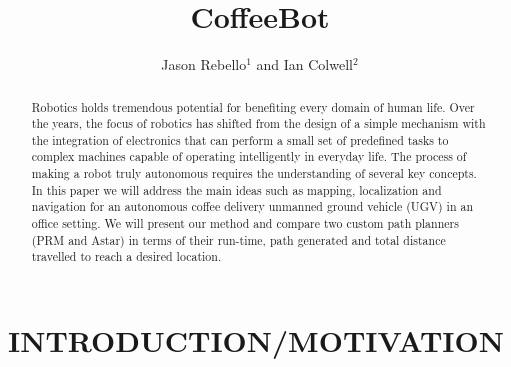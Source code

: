 \documentclass[letterpaper, 10 pt, conference]{ieeeconf}  %
\title{\LARGE \bf
CoffeeBot
}
\author{Jason Rebello$^{1}$ and Ian Colwell$^{2}$%
}
\begin{document}
\maketitle
\thispagestyle{empty}
\pagestyle{empty}


\begin{abstract}

Robotics holds tremendous potential for benefiting every domain of human life. Over the years, the focus of robotics has shifted from the design of a simple mechanism with the integration of electronics that can perform a small set of predefined tasks to complex machines capable of operating intelligently in everyday life. The process of making a robot truly autonomous requires the understanding of several key concepts. In this paper we will address the main ideas such as mapping, localization and navigation for an autonomous coffee delivery unmanned ground vehicle (UGV) in an office setting. We will present our method and compare two custom path planners (PRM and Astar) in terms of their run-time, path generated and total distance travelled to reach a desired location.

\end{abstract}

\section{INTRODUCTION/MOTIVATION}
\end{document}
